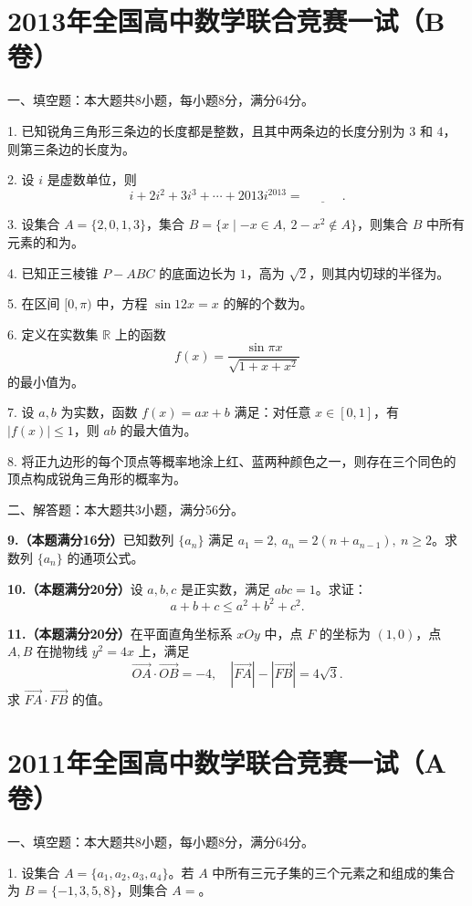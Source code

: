 \documentclass[11pt]{ctexart}
\begin{document}
\clearpage
\section*{2013年全国高中数学联合竞赛一试（B卷）}

一、填空题：本大题共8小题，每小题8分，满分64分。

1. 已知锐角三角形三条边的长度都是整数，且其中两条边的长度分别为 $3$ 和 $4$，则第三条边的长度为\blank{}。

2. 设 $i$ 是虚数单位，则
$$
i+2i^2+3i^3+\cdots+2013i^{2013}=\underline{\hspace{3em}}.
$$

3. 设集合 $A=\{2,0,1,3\}$，集合 $B=\{x\mid -x\in A,\ 2-x^2\notin A\}$，则集合 $B$ 中所有元素的和为\blank{}。

4. 已知正三棱锥 $P-ABC$ 的底面边长为 $1$，高为 $\sqrt2$，则其内切球的半径为\blank{}。

5. 在区间 $[0,\pi)$ 中，方程 $\sin 12x=x$ 的解的个数为\blank{}。

6. 定义在实数集 $\mathbb R$ 上的函数
$$
f(x)=\frac{\sin\pi x}{\sqrt{1+x+x^2}}
$$
的最小值为\blank{}。

7. 设 $a,b$ 为实数，函数 $f(x)=ax+b$ 满足：对任意 $x\in[0,1]$，有 $|f(x)|\le1$，则 $ab$ 的最大值为\blank{}。

8. 将正九边形的每个顶点等概率地涂上红、蓝两种颜色之一，则存在三个同色的顶点构成锐角三角形的概率为\blank{}。

二、解答题：本大题共3小题，满分56分。


\clearpage
\textbf{9.（本题满分16分）}已知数列 $\{a_n\}$ 满足 $a_1=2,\ a_n=2(n+a_{n-1}),\ n\ge2$。求数列 $\{a_n\}$ 的通项公式。

\clearpage
\textbf{10.（本题满分20分）}设 $a,b,c$ 是正实数，满足 $abc=1$。求证：
$$
a+b+c\le a^2+b^2+c^2.
$$

\clearpage
\textbf{11.（本题满分20分）}在平面直角坐标系 $xOy$ 中，点 $F$ 的坐标为 $(1,0)$，点 $A,B$ 在抛物线 $y^2=4x$ 上，满足
$$
\overrightarrow{OA}\cdot\overrightarrow{OB}=-4,\quad |\overrightarrow{FA}|-|\overrightarrow{FB}|=4\sqrt3.
$$
求 $\overrightarrow{FA}\cdot\overrightarrow{FB}$ 的值。

\clearpage
\section*{2011年全国高中数学联合竞赛一试（A卷）}

一、填空题：本大题共8小题，每小题8分，满分64分。

1. 设集合 $A=\{a_1,a_2,a_3,a_4\}$。若 $A$ 中所有三元子集的三个元素之和组成的集合为 $B=\{-1,3,5,8\}$，则集合 $A=$\blank{}。
\end{document}
